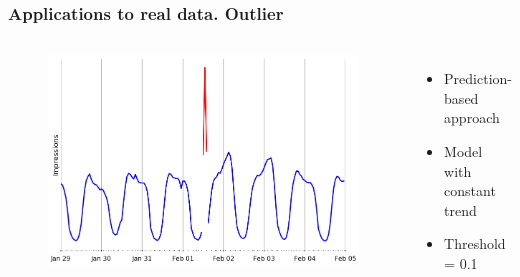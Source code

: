 \documentclass[intlimits, 9pt, unicode]{beamer}
\begin{document}
\begin{frame}
    \frametitle{Applications to real data. Outlier}
  \begin{columns}[T,onlytextwidth]
	\begin{figure}
	\includegraphics[scale=0.2]{images/methods_comparison_4}
	\end{figure}
	    \begin{itemize}
	    \item Prediction-based approach 
        \item Model with constant trend
        \item Threshold = 0.1
	    \end{itemize}
     \end{columns}

\end{frame}
\end{document}
